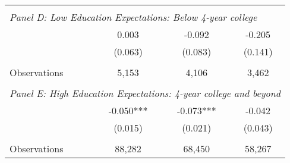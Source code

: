 {\begin{tabular}{lccc}
&  &  &   \\
\multicolumn{4}{l}{\textit{Panel D: Low Education Expectations: Below 4-year college}} \\
\hspace{3mm}        &       0.003   &      -0.092   &      -0.205   \\
                    &     (0.063)   &     (0.083)   &     (0.141)   \\
                    &               &               &               \\
\hspace{3mm}Observations&       5,153   &       4,106   &       3,462   \\
 
&  &  &   \\
\multicolumn{4}{l}{\textit{Panel E: High Education Expectations: 4-year college and beyond}} \\
\hspace{3mm}        &      -0.050***&      -0.073***&      -0.042   \\
                    &     (0.015)   &     (0.021)   &     (0.043)   \\
                    &               &               &               \\
\hspace{3mm}Observations&      88,282   &      68,450   &      58,267   \\
 

\bottomrule
\end{tabular}
}
